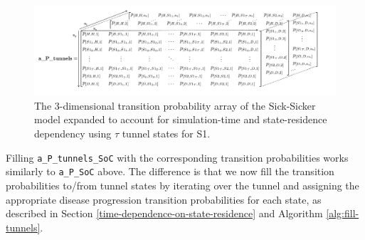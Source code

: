 \documentclass[
]{article}
\begin{document}
\begin{figure}[H]

{\centering \includegraphics[width=1\linewidth]{figs/Figure 5 - 3D-state-transition-array-sick-sicker-tunnels} 

}

\caption{The 3-dimensional transition probability array of the Sick-Sicker model expanded to account for simulation-time and state-residence dependency using $\tau$ tunnel states for S1.}\label{fig:Array-Time-Dependent-Tunnels}
\end{figure}

Filling \texttt{a\_P\_tunnels\_SoC} with the corresponding transition probabilities works similarly to \texttt{a\_P\_SoC} above. The difference is that we now fill the transition probabilities to/from tunnel states by iterating over the tunnel and assigning the appropriate disease progression transition probabilities for each state, as described in Section \ref{time-dependence-on-state-residence} and Algorithm \ref{alg:fill-tunnels}.
\end{document}
